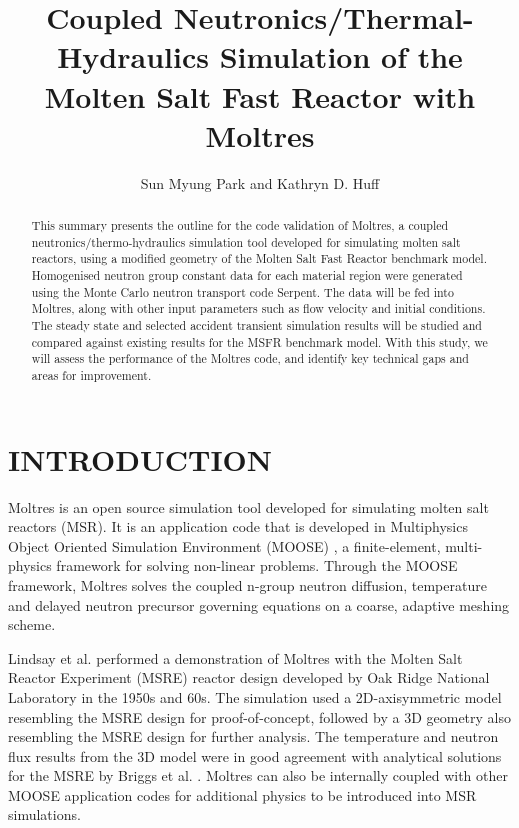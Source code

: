 \documentclass{anstrans}
\title{Coupled Neutronics/Thermal-Hydraulics Simulation of the Molten Salt Fast Reactor with Moltres}
\author{Sun Myung Park and Kathryn D. Huff}
\institute{Dept. of Nuclear, Plasma and Radiological Engineering, University of Illinois at Urbana-Champaign \\
smpark3@illinois.edu}
\begin{document}
\begin{abstract}
This summary presents the outline for the code validation of Moltres, a coupled neutronics/thermo-hydraulics simulation tool developed for simulating molten salt reactors, using a modified geometry of the Molten Salt Fast Reactor benchmark model. Homogenised neutron group constant data for each material region were generated using the Monte Carlo neutron transport code Serpent. The data will be fed into Moltres, along with other input parameters such as flow velocity and initial conditions. The steady state and selected accident transient simulation results will be studied and compared against existing results for the MSFR benchmark model. With this study, we will assess the performance of the Moltres code, and identify key technical gaps and areas for improvement.
\end{abstract}

\section{INTRODUCTION}

Moltres is an open source simulation tool developed for simulating molten salt reactors (MSR). It is an application code that is developed in Multiphysics Object Oriented Simulation Environment (MOOSE) \cite{gaston_moose:_2009}, a finite-element, multi-physics framework for solving non-linear problems. Through the MOOSE framework, Moltres solves the coupled n-group neutron diffusion, temperature and delayed neutron precursor governing equations on a coarse, adaptive meshing scheme. 

Lindsay et al. \cite{lindsay_introduction_2018} performed a demonstration of Moltres with the Molten Salt Reactor Experiment (MSRE) reactor design developed by Oak Ridge National Laboratory in the 1950s and 60s. The simulation used a 2D-axisymmetric model resembling the MSRE design for proof-of-concept, followed by a 3D geometry also resembling the MSRE design for further analysis. The temperature and neutron flux results from the 3D model were in good agreement with analytical solutions for the MSRE by Briggs et al. \cite{briggs_molten-salt_1964}. Moltres can also be internally coupled with other MOOSE application codes for additional physics to be introduced into MSR simulations.

\end{document}
